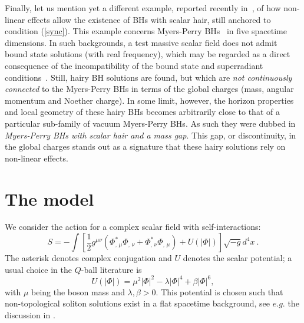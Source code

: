 \bigskip

Finally, let us mention yet a different example, reported recently in~\cite{Brihaye:2014nba}, of how non-linear effects allow the existence of BHs with scalar hair, still anchored to condition (\ref{sync}). This example concerns Myers-Perry BHs~\cite{Myers:1986un} in five spacetime dimensions. In such backgrounds, a test massive scalar field does not admit bound state solutions (with real frequency), which may be regarded as a direct consequence of the incompatibility of the bound state and superradiant conditions~\cite{Cardoso:2005vk,Kunduri:2006qa}. Still, hairy BH solutions are found,  but which are  \textit{not continuously connected} to the Myers-Perry BHs in terms of the global charges (mass, angular momentum and Noether charge). In some limit, however, the horizon properties and local geometry of these hairy BHs becomes arbitrarily close to that of a particular sub-family of vacuum Myers-Perry BHs. As such they were dubbed in~\cite{Brihaye:2014nba} \textit{Myers-Perry BHs with scalar hair and a mass gap}. This gap, or discontinuity, in the global charges stands out as a signature that these hairy solutions rely on non-linear effects. 






\section{The model}



We consider the action for a complex scalar field with self-interactions:
\begin{equation}
\label{action}
S=-\int \left[ 
   \frac{1}{2} g^{\mu\nu}\left( \Phi_{, \, \mu}^* \Phi_{, \, \nu} + \Phi _
{, \, \nu}^* \Phi _{, \, \mu} \right) + U( \left| \Phi \right|) 
 \right] \sqrt{-g} d^4x
\ . 
\end{equation}
The asterisk denotes complex conjugation 
and $U$ denotes the scalar potential; a usual choice in the $Q$-ball literature is 
\begin{equation}
U(|\Phi|) =  \mu^2 |\Phi|^2-\lambda |\Phi|^4 +\beta |\Phi|^6,
\label{U} 
\end{equation}
with $\mu$ being the boson mass and $\lambda,\beta>0$.
This potential is chosen such that non-topological soliton solutions
exist in a flat spacetime background, see $e.g.$ the discussion in \cite{Volkov:2002aj}.


